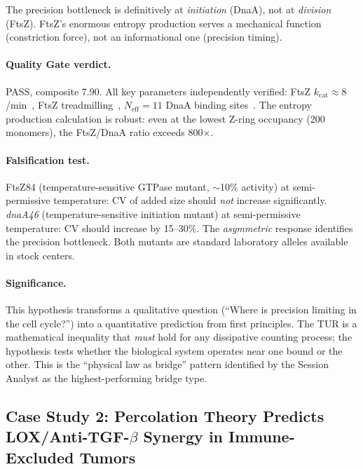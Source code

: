 The precision bottleneck is definitively at \emph{initiation} (DnaA), not at \emph{division} (FtsZ). FtsZ's enormous entropy production serves a mechanical function (constriction force), not an informational one (precision timing).

\paragraph{Quality Gate verdict.} PASS, composite 7.90. All key parameters independently verified: FtsZ $k_\text{cat} \approx 8$/min~\citep{romberg2004}, FtsZ treadmilling~\citep{bissonfilho2017}, $N_\text{eff} = 11$ DnaA binding sites~\citep{mcgarry2004}. The entropy production calculation is robust: even at the lowest Z-ring occupancy (200 monomers), the FtsZ/DnaA ratio exceeds 800$\times$.

\paragraph{Falsification test.} FtsZ84 (temperature-sensitive GTPase mutant, $\sim$10\% activity)
at semi-per\-mis\-sive temperature: CV of added size should \emph{not} increase significantly. \textit{dnaA46} (temperature-sensitive initiation mutant) at semi-permissive temperature: CV should increase by 15--30\%. The \emph{asymmetric} response identifies the precision bottleneck. Both mutants are standard laboratory alleles available in stock centers.

\paragraph{Significance.} This hypothesis transforms a qualitative question (``Where is precision limiting in the cell cycle?'') into a quantitative prediction from first principles. The TUR is a mathematical inequality that \emph{must} hold for any dissipative counting process; the hypothesis tests whether the biological system operates near one bound or the other. This is the ``physical law as bridge'' pattern identified by the Session Analyst as the highest-performing bridge type.

\subsection{Case Study 2: Percolation Theory Predicts LOX/Anti-TGF-\texorpdfstring{$\beta$}{β} Synergy in Immune-Excluded Tumors}
\label{sec:case_percolation}

